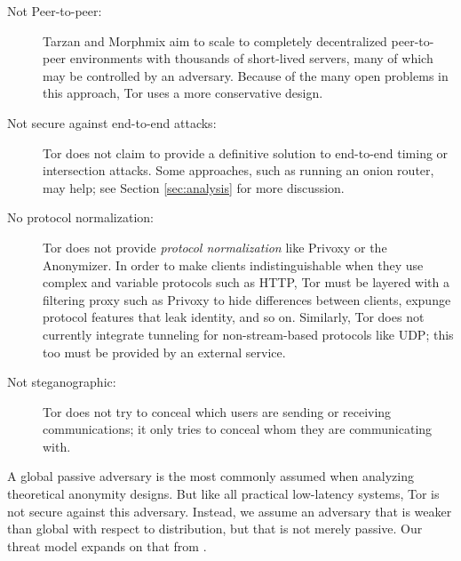 \documentclass[times,10pt,twocolumn]{article}
\begin{document}
\begin{description}
\item[Not Peer-to-peer:] Tarzan and Morphmix aim to
  scale to completely decentralized peer-to-peer environments with thousands
  of short-lived servers, many of which may be controlled by an adversary.
  Because of the many open problems in this approach, Tor uses a more
  conservative design.
\item[Not secure against end-to-end attacks:] Tor does not claim to provide a
  definitive solution to end-to-end timing or intersection attacks. Some
  approaches, such as running an onion router, may help; see Section
  \ref{sec:analysis} for more discussion.
\item[No protocol normalization:] Tor does not provide \emph{protocol
  normalization} like Privoxy or the Anonymizer.  In order to make clients
  indistinguishable when they use complex and variable protocols such as HTTP,
  Tor must be layered with a filtering proxy such as Privoxy to hide
  differences between clients, expunge protocol features that leak identity,
  and so on.  Similarly, Tor does not currently integrate tunneling for
  non-stream-based protocols like UDP; this too must be provided by
  an external service.
\item[Not steganographic:] Tor does not try to conceal which users are
  sending or receiving communications; it only tries to conceal whom they are
  communicating with.
\end{description}

\label{subsec:adversary-model}

A global passive adversary is the most commonly assumed when
analyzing theoretical anonymity designs. But like all practical low-latency
systems, Tor is not secure against this adversary.  Instead, we assume an
adversary that is weaker than global with respect to distribution, but that
is not merely passive.  Our threat model expands on that from
\cite{or-pet00}.
\end{document}

